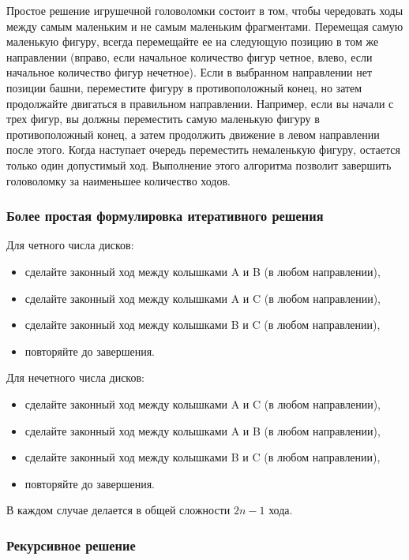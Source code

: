 Простое решение игрушечной головоломки состоит в том, чтобы чередовать ходы
между самым маленьким и не самым маленьким фрагментами. Перемещая самую
маленькую фигуру, всегда перемещайте ее на следующую позицию в том же
направлении (вправо, если начальное количество фигур четное, влево, если
начальное количество фигур нечетное). Если в выбранном направлении нет позиции
башни, переместите фигуру в противоположный конец, но затем продолжайте
двигаться в правильном направлении. Например, если вы начали с трех фигур, вы
должны переместить самую маленькую фигуру в противоположный конец, а затем
продолжить движение в левом направлении после этого. Когда наступает очередь
переместить немаленькую фигуру, остается только один допустимый ход. Выполнение
этого алгоритма позволит завершить головоломку за наименьшее количество ходов.

\subsubsection*{Более простая формулировка итеративного решения}

Для четного числа дисков:

\begin{itemize}
	\item сделайте законный ход между колышками A и B (в любом направлении),
	\item сделайте законный ход между колышками A и C (в любом направлении),
	\item сделайте законный ход между колышками B и C (в любом направлении),
	\item повторяйте до завершения.
\end{itemize}

Для нечетного числа дисков:

\begin{itemize}
	\item сделайте законный ход между колышками A и C (в любом направлении),
	\item сделайте законный ход между колышками A и B (в любом направлении),
	\item сделайте законный ход между колышками B и C (в любом направлении),
	\item повторяйте до завершения.
\end{itemize}

В каждом случае делается в общей сложности $2n - 1$ хода.

\subsubsection{Рекурсивное решение}

